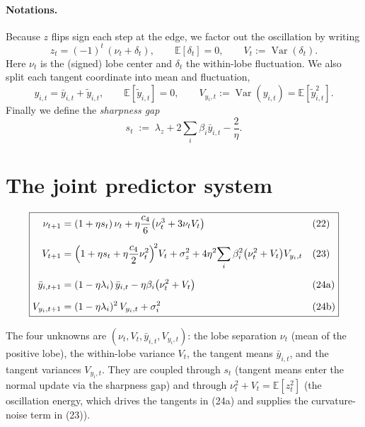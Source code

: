 \documentclass{article} %
\theoremstyle{plain}
\theoremstyle{definition}
\newcommand{\E}{\mathbb{E}}
\newcommand{\Var}{\operatorname{Var}}
\newcommand{\ybar}{\bar{y}}
\newcommand{\ytil}{\tilde{y}}
\begin{document}
\begin{itemize}[nosep,leftmargin=*]
\paragraph{Notations.} Because $z$ flips sign each step at the edge, we factor out the
oscillation by writing
\begin{equation}
z_t = (-1)^t\,(\nu_t + \delta_t),\qquad \E[\delta_t]=0,\qquad V_t := \Var(\delta_t).
\label{eq:lobeframe}
\end{equation}
Here $\nu_t$ is the (signed) lobe center and $\delta_t$ the within-lobe fluctuation.
We also split each tangent coordinate into mean and fluctuation,
\begin{equation}
y_{i,t} = \ybar_{i,t} + \ytil_{i,t},\qquad \E[\ytil_{i,t}]=0,\qquad
V_{y_i,t} := \Var(y_{i,t}) = \E[\ytil_{i,t}^2].
\label{eq:ysplit}
\end{equation}
Finally we define the \emph{sharpness gap}
\begin{equation}
s_t \;:=\; \lambda_z + 2\sum_i \beta_i \ybar_{i,t} - \frac{2}{\eta}.
\label{eq:sdef}
\end{equation}

\section{The joint predictor system}
 
 
\begin{equation*}
\boxed{\begin{aligned}
\nu_{t+1} &= (1+\eta s_t)\,\nu_t
 + \eta\frac{c_4}{6}\big(\nu_t^3 + 3\nu_t V_t\big)
 &&\textup{(22)}\\[6pt]
V_{t+1} &= \Big(1+\eta s_t + \eta\frac{c_4}{2}\nu_t^2
            \Big)^{\!2} V_t
 + \sigma_z^2
 + 4\eta^2\!\sum_i \beta_i^2\big(\nu_t^2 + V_t\big)V_{y_i,t}
 &&\textup{(23)}\\[6pt]
\ybar_{i,t+1} &= (1-\eta\lambda_i)\,\ybar_{i,t}
 - \eta\beta_i\big(\nu_t^2 + V_t\big)
 &&\textup{(24a)}\\[6pt]
V_{y_i,t+1} &= (1-\eta\lambda_i)^2\,V_{y_i,t} + \sigma_i^2
 &&\textup{(24b)}
\end{aligned}}
\label{eq:predictor}
\end{equation*}
 
\noindent The four unknowns are $(\nu_t, V_t, \ybar_{i,t}, V_{y_i,t})$:
the lobe separation $\nu_t$ (mean of the positive lobe), the within-lobe variance $V_t$,
the tangent means $\ybar_{i,t}$, and the tangent variances $V_{y_i,t}$.
They are coupled through $s_t$ (tangent means enter the normal update via the sharpness gap)
and through $\nu_t^2+V_t=\mathbb E[z_t^2]$ (the oscillation energy, which drives the tangents
in (24a) and supplies the curvature-noise term in (23)).



\end{itemize}
\end{document}
